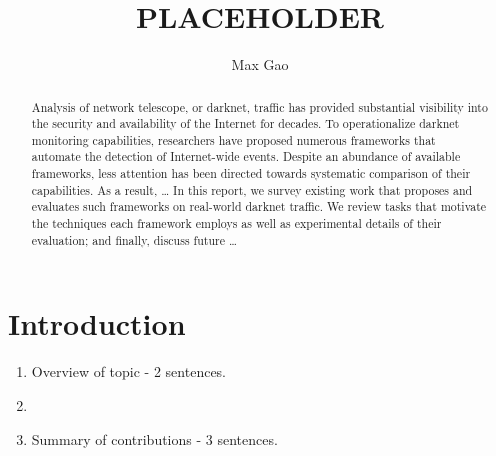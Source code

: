 \documentclass[manuscript,nonacm]{acmart}
\begin{document}
\title{PLACEHOLDER}
\author{Max Gao}

\begin{abstract}
Analysis of network telescope, or darknet, traffic has provided substantial visibility into the security and availability of the Internet for decades.
To operationalize darknet monitoring capabilities, researchers have proposed numerous frameworks that automate the detection of Internet-wide events.
Despite an abundance of available frameworks, less attention has been directed towards systematic comparison of their capabilities. 
As a result, \dots
In this report, we survey existing work that proposes and evaluates such frameworks on real-world darknet traffic.
We review tasks that motivate the techniques each framework employs as well as experimental details of their evaluation; and finally, discuss future \dots
\end{abstract}

\maketitle

\section{Introduction}

\begin{enumerate}
  \item Overview of topic - 2 sentences.
  \item 
  \item Summary of contributions - 3 sentences.
\end{enumerate}

\end{document}
